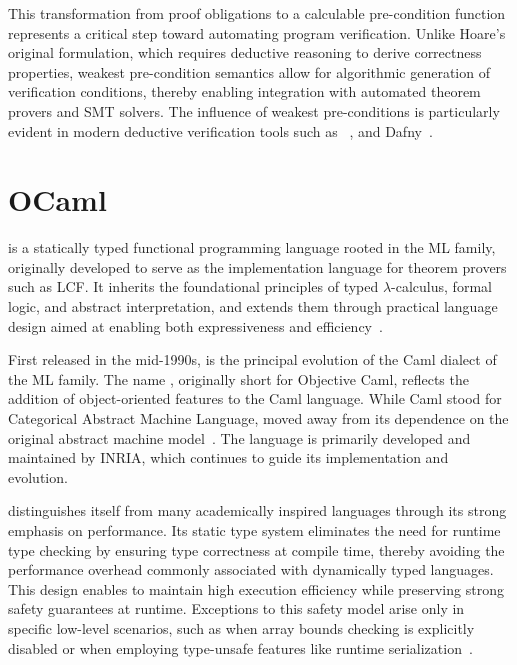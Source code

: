 This transformation from proof obligations to a calculable pre-condition function represents a critical step toward automating 
program verification. Unlike Hoare's original formulation, which requires deductive reasoning to derive correctness properties, 
weakest pre-condition semantics allow for algorithmic generation of verification conditions, thereby enabling integration 
with automated theorem provers and SMT solvers. The influence of weakest pre-conditions is particularly evident in modern 
deductive verification tools such as \whythree~\cite{boogie11why3}, and \textsf{Dafny}~\cite{Leino10}.

\section{OCaml}
\label{sec:OCaml}

\ocaml is a statically typed functional programming language rooted in the ML family, originally developed 
to serve as the implementation language for theorem provers such as LCF. It inherits the foundational principles 
of typed $\lambda$-calculus, formal logic, and abstract interpretation, and extends them through practical language design 
aimed at enabling both expressiveness and efficiency~\cite{FilliatrePereiraSousa2018}.

First released in the mid-1990s, \ocaml is the principal evolution of the Caml dialect of the ML family. The name \ocaml, 
originally short for Objective Caml, reflects the addition of object-oriented features to the Caml language. While Caml 
stood for Categorical Abstract Machine Language, \ocaml moved away from its dependence on the original abstract machine 
model~\cite{leroy:inria-00070049}. The language is primarily developed and maintained by INRIA, which continues to guide 
its implementation and evolution.

\ocaml distinguishes itself from many academically inspired languages through its strong emphasis on performance. Its static 
type system eliminates the need for runtime type checking by ensuring type correctness at compile time, thereby avoiding the 
performance overhead commonly associated with dynamically typed languages. This design enables \ocaml to maintain high 
execution efficiency while preserving strong safety guarantees at runtime. Exceptions to this safety model arise only in 
specific low-level scenarios, such as when array bounds checking is explicitly disabled or when employing type-unsafe features 
like runtime serialization~\cite{FilliatrePereiraSousa2018}.

